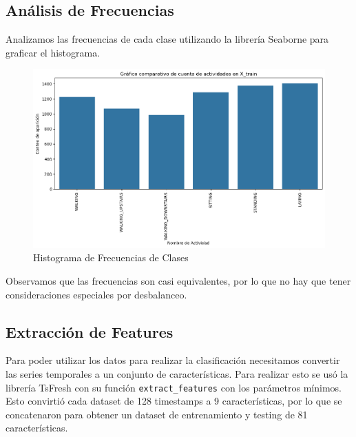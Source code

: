\documentclass[conference]{IEEEtran}
\begin{document}
\subsection{Análisis de Frecuencias}
Analizamos las frecuencias de cada clase utilizando la librería Seaborne para graficar el histograma.
\begin{figure}
    \centering
    \includegraphics[width=\linewidth]{class_freq.png}
    \caption{Histograma de Frecuencias de Clases}
    \label{fig1}
\end{figure}
Observamos que las frecuencias son casi equivalentes, por lo que no hay que tener consideraciones especiales por desbalanceo.

\subsection{Extracción de Features}
Para poder utilizar los datos para realizar la clasificación necesitamos convertir las series temporales a un conjunto de características. Para realizar esto se usó la librería TsFresh con su función \texttt{extract\_features} con los parámetros mínimos. Esto convirtió cada dataset de 128 timestamps a 9 características, por lo que se concatenaron para obtener un dataset de entrenamiento y testing de 81 características.
\end{document}
